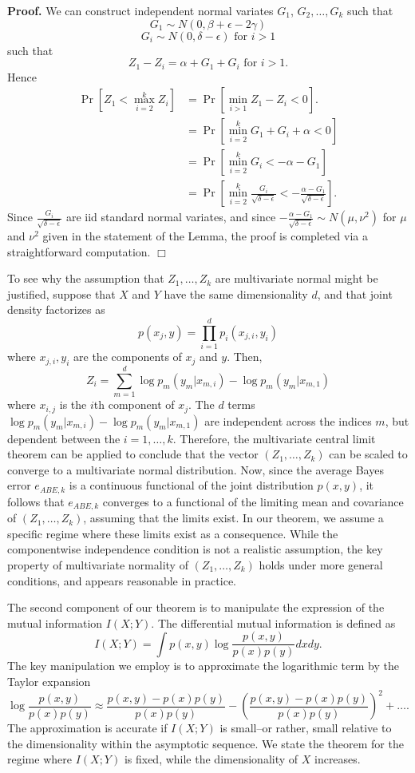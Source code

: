 \documentclass[12pt]{article}
\begin{document}
\textbf{Proof.}
We can construct independent normal variates $G_1$, $G_2,\hdots, G_k$
such that
\[
G_1 \sim N(0, \beta + \epsilon - 2 \gamma)
\]
\[
G_i \sim N(0, \delta - \epsilon)\text{ for }i > 1
\]
such that
\[
Z_1 - Z_i = \alpha + G_1 + G_i \text{ for }i > 1.
\]
Hence
\begin{align*}
\Pr[Z_1 < \max_{i=2}^k Z_i] &= \Pr[\min_{i > 1} Z_1 - Z_i < 0].
\\&= \Pr[\min_{i=2}^{k} G_1 + G_i + \alpha < 0]
\\&= \Pr[\min_{i=2}^{k} G_i < -\alpha - G_1]
\\&= \Pr[\min_{i=2}^{k} \frac{G_i}{\sqrt{\delta - \epsilon}} < -\frac{\alpha - G_1}{\sqrt{\delta - \epsilon}}].
\end{align*}
Since $\frac{G_i}{\sqrt{\delta - \epsilon}}$ are iid standard normal variates, and since
$-\frac{\alpha - G_1}{\sqrt{\delta - \epsilon}} \sim N(\mu,\nu^2)$ for $\mu$ and $\nu^2$ given in the statement of the Lemma, the proof is completed via a straightforward computation.  $\Box$

To see why the assumption that $Z_1,\hdots, Z_k$ are multivariate normal might be justified, suppose that $X$ and $Y$ have the same dimensionality $d$, and that
joint density factorizes as
\[
p(x_j, y) = \prod_{i=1}^d p_i(x_{j, i}, y_i)
\]
where $x_{j, i}, y_i$ are the components of $x_j$ and $y$.
Then,
\[
Z_i = \sum_{m=1}^d \log p_m(y_m | x_{m, i}) - \log p_m(y_m | x_{m, 1})
\]
where $x_{i, j}$ is the $i$th component of $x_j$.
The $d$ terms $\log p_m(y_m | x_{m, i}) - \log p_m(y_m | x_{m, 1})$ are independent across the indices $m$,
but dependent between the $i = 1,\hdots, k$.
Therefore, the multivariate central limit theorem can be applied to conclude that the vector
$(Z_1,\hdots, Z_k)$ can be scaled to converge to a multivariate normal distribution.
Now, since the average Bayes error $e_{ABE,k}$ is a continuous functional of the joint distribution $p(x, y)$,
it follows that $e_{ABE,k}$ converges to a functional of the limiting mean and covariance of $(Z_1,\hdots, Z_k)$, assuming
that the limits exist.
In our theorem, we assume a specific regime where these limits exist as a consequence.
While the componentwise independence condition is not a realistic assumption,
the key property of multivariate normality of $(Z_1,\hdots, Z_k)$ holds under more general conditions, and appears reasonable in practice.

The second component of our theorem is to manipulate the expression of the mutual information $I(X; Y)$.
The differential mutual information is defined as
\[
I(X; Y) = \int p(x, y) \log \frac{p(x, y)}{p(x) p(y)} dx dy.
\]
The key manipulation we employ is to approximate the logarithmic term by the Taylor expansion
\[
\log \frac{p(x, y)}{p(x) p(y)} \approx \frac{p(x, y) - p(x) p(y)}{p(x) p(y)} - \left(\frac{p(x, y) - p(x) p(y)}{p(x) p(y)}\right)^2 + \hdots.
\]
The approximation is accurate if $I(X; Y)$ is small--or rather, small relative to the dimensionality within the asymptotic sequence.
We state the theorem for the regime where $I(X; Y)$ is fixed, while the dimensionality of $X$ increases.
\end{document}
